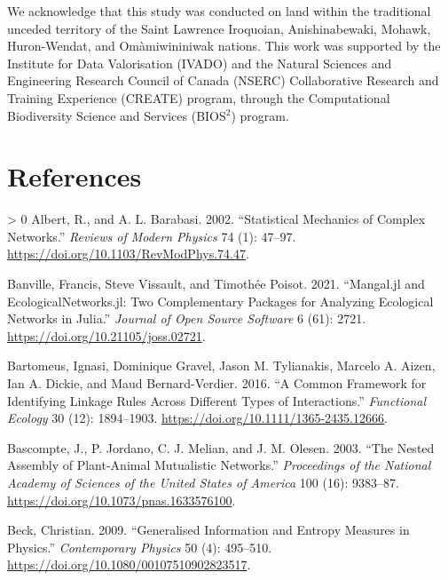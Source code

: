 \documentclass[11pt]{article}
\newlength{\cslhangindent}
\newenvironment{CSLReferences}[3] %
 {%
  \setlength{\parindent}{0pt}
  \ifodd #1 \everypar{\setlength{\hangindent}{\cslhangindent}}\ignorespaces\fi
  \ifnum #2 > 0
  \setlength{\parskip}{#2\baselineskip}
  \fi
 }%
 {}
\begin{document}
We acknowledge that this study was conducted on land within the
traditional unceded territory of the Saint Lawrence Iroquoian,
Anishinabewaki, Mohawk, Huron-Wendat, and Omàmiwininiwak nations. This
work was supported by the Institute for Data Valorisation (IVADO) and
the Natural Sciences and Engineering Research Council of Canada (NSERC)
Collaborative Research and Training Experience (CREATE) program, through
the Computational Biodiversity Science and Services (BIOS\(^2\))
program.

\hypertarget{references}{%
\section*{References}\label{references}}

\hypertarget{refs}{}
\begin{CSLReferences}{1}{0}
\leavevmode\hypertarget{ref-Albert2002StaMec}{}%
Albert, R., and A. L. Barabasi. 2002. {``Statistical Mechanics of
Complex Networks.''} \emph{Reviews of Modern Physics} 74 (1): 47--97.
\url{https://doi.org/10.1103/RevModPhys.74.47}.

\leavevmode\hypertarget{ref-Banville2021ManJla}{}%
Banville, Francis, Steve Vissault, and Timothée Poisot. 2021.
{``Mangal.jl and EcologicalNetworks.jl: Two Complementary Packages for
Analyzing Ecological Networks in Julia.''} \emph{Journal of Open Source
Software} 6 (61): 2721. \url{https://doi.org/10.21105/joss.02721}.

\leavevmode\hypertarget{ref-Bartomeus2016ComFra}{}%
Bartomeus, Ignasi, Dominique Gravel, Jason M. Tylianakis, Marcelo A.
Aizen, Ian A. Dickie, and Maud Bernard-Verdier. 2016. {``A Common
Framework for Identifying Linkage Rules Across Different Types of
Interactions.''} \emph{Functional Ecology} 30 (12): 1894--1903.
\url{https://doi.org/10.1111/1365-2435.12666}.

\leavevmode\hypertarget{ref-Bascompte2003NesAssa}{}%
Bascompte, J., P. Jordano, C. J. Melian, and J. M. Olesen. 2003. {``The
Nested Assembly of Plant-Animal Mutualistic Networks.''}
\emph{Proceedings of the National Academy of Sciences of the United
States of America} 100 (16): 9383--87.
\url{https://doi.org/10.1073/pnas.1633576100}.

\leavevmode\hypertarget{ref-Beck2009GenInf}{}%
Beck, Christian. 2009. {``Generalised Information and Entropy Measures
in Physics.''} \emph{Contemporary Physics} 50 (4): 495--510.
\url{https://doi.org/10.1080/00107510902823517}.


\end{CSLReferences}
\end{document}
